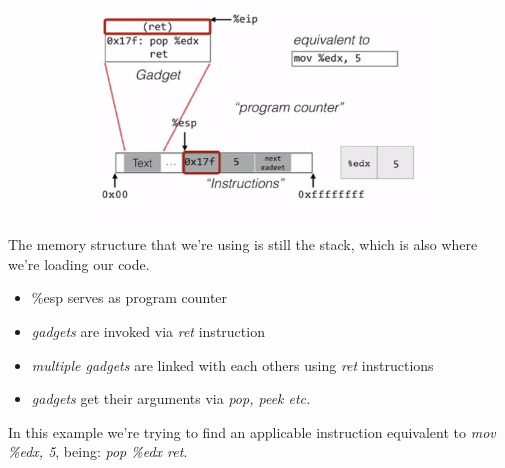 \documentclass[11pt, oneside]{article}   	%
\begin{document}
\begin{figure}[H]
\hfill
\begin{subfigure}[H]{0.5\linewidth}
\includegraphics[width=\linewidth]{gadex}
\end{subfigure}%
\end{figure}
The memory structure that we're using is still the stack, which is also where we're loading our code.\begin{itemize}
\item \%esp serves as program counter
\item \emph{gadgets} are invoked via \emph{ret} instruction
\item \emph{multiple gadgets} are linked with each others using \emph{ret} instructions
\item \emph{gadgets} get their arguments via \emph{pop, peek etc.}
\end{itemize}
In this example we're trying to find an applicable instruction equivalent to \emph{mov \%edx, 5}, being: \emph{pop \%edx ret}.\\
\end{document}
